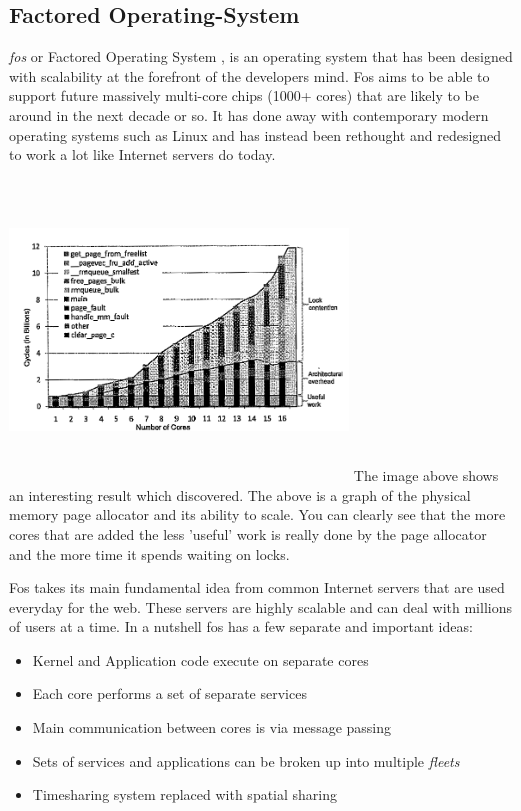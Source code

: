 \documentclass[journal]{IEEEtran}
\begin{document}
\subsection{Factored Operating-System}

\emph{fos} or Factored Operating System \cite{fos}, is an operating system that has been designed with scalability at the forefront of the developers mind. Fos aims to be able to support future massively multi-core chips (1000+ cores) that are likely to be around in the next decade or so. It has done away with contemporary modern operating systems such as Linux and has instead been rethought and redesigned to work a lot like Internet servers do today.

\includegraphics[width =9cm, height =8cm]{image.png}
The image above shows an interesting result which \cite{fos} discovered. The above is a graph of the physical memory page allocator and its ability to scale. You can clearly see that the more cores that are added the less 'useful' work is really done by the page allocator and the more time it spends waiting on locks. 

Fos takes its main fundamental idea from common Internet servers that are used everyday for the web. These servers are highly scalable and can deal with millions of users at a time. In a nutshell fos has a few separate and important ideas:

\vspace{2 mm}

\begin{itemize}
\item Kernel and Application code execute on separate cores
\item Each core performs a set of separate services
\item Main communication between cores is via message passing
\item Sets of services and applications can be broken up into multiple \emph{fleets}
\item Timesharing system replaced with spatial sharing
\end{itemize}
\end{document}
